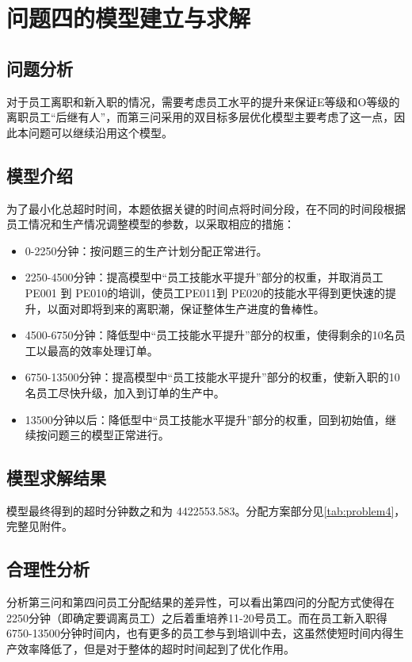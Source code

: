 \section{问题四的模型建立与求解}
\subsection{问题分析}

对于员工离职和新入职的情况，需要考虑员工水平的提升来保证E等级和O等级的离职员工“后继有人”，而第三问采用的双目标多层优化模型主要考虑了这一点，因此本问题可以继续沿用这个模型。
\subsection{模型介绍}

为了最小化总超时时间，本题依据关键的时间点将时间分段，在不同的时间段根据员工情况和生产情况调整模型的参数，以采取相应的措施：
\begin{itemize}[left=1em]
    \item 0-2250分钟：按问题三的生产计划分配正常进行。
    \item 2250-4500分钟：提高模型中“员工技能水平提升”部分的权重，并取消员工PE001 到 PE010的培训，使员工PE011到 PE020的技能水平得到更快速的提升，以面对即将到来的离职潮，保证整体生产进度的鲁棒性\cite{robust}。
    \item 4500-6750分钟：降低型中“员工技能水平提升”部分的权重，使得剩余的10名员工以最高的效率处理订单。
    \item 6750-13500分钟：提高模型中“员工技能水平提升”部分的权重，使新入职的10名员工尽快升级，加入到订单的生产中。
    \item 13500分钟以后：降低型中“员工技能水平提升”部分的权重，回到初始值，继续按问题三的模型正常进行。
\end{itemize}

\subsection{模型求解结果}
模型最终得到的超时分钟数之和为 4422553.583。分配方案部分见\cref{tab:problem4}，完整见附件。

\subsection{合理性分析}
分析第三问和第四问员工分配结果的差异性，可以看出第四问的分配方式使得在2250分钟（即确定要调离员工）之后着重培养11-20号员工。而在员工新入职得6750-13500分钟时间内，也有更多的员工参与到培训中去，这虽然使短时间内得生产效率降低了，但是对于整体的超时时间起到了优化作用。

